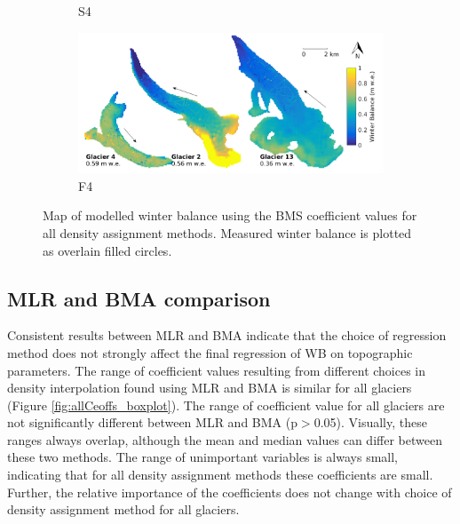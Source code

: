 \documentclass{sfuthesis}
\begin{document}
\begin{figure}[H]
\begin{subfigure}[b]{0.475\textwidth}
            \caption[]%
            {{\small S4}}    
        \end{subfigure}
        \quad
        \begin{subfigure}[b]{0.475\textwidth}   
            \centering 
            \includegraphics[width=\textwidth]{BMSmap_Modelled_Observed8.png}
            \caption[]%
            {{\small F4}}    
        \end{subfigure}
              
        \caption[Map of modelled winter balance using the BMS coefficient values for all density assignment methods. Measured winter balance is plotted as overlain filled circles.]
        {\small Map of modelled winter balance using the BMS coefficient values for all density assignment methods. Measured winter balance is plotted as overlain filled circles.} 
        \label{fig:allBMSmodelled}
    \end{figure}




\subsection{MLR and BMA comparison}


Consistent results between MLR and BMA indicate that the choice of regression method does not strongly affect the final regression of WB on topographic parameters. The range of coefficient values resulting from different choices in density interpolation found using MLR and BMA is similar for all glaciers (Figure \ref{fig:allCeoffs_boxplot}). The range of coefficient value for all glaciers are not significantly different between MLR and BMA (p$>$0.05). Visually, these ranges always overlap, although the mean and median values can differ between these two methods. The range of unimportant variables is always small, indicating that for all density assignment methods these coefficients are small. Further, the relative importance of the coefficients does not change with choice of density assignment method for all glaciers. 
\end{document}
